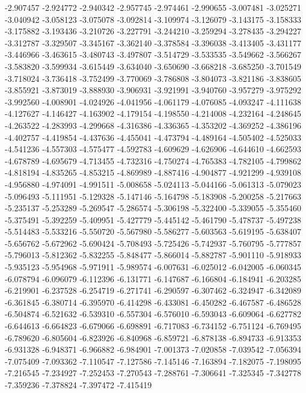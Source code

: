 -2.907457
-2.924772
-2.940342
-2.957745
-2.974461
-2.990655
-3.007481
-3.025271
-3.040942
-3.058123
-3.075078
-3.092814
-3.109974
-3.126079
-3.143175
-3.158333
-3.175882
-3.193436
-3.210726
-3.227791
-3.244210
-3.259294
-3.278435
-3.294227
-3.312787
-3.329507
-3.345167
-3.362140
-3.378584
-3.396038
-3.413405
-3.431177
-3.446966
-3.463615
-3.480743
-3.497807
-3.514729
-3.533535
-3.549662
-3.566267
-3.583820
-3.599934
-3.615449
-3.634040
-3.650690
-3.668218
-3.685250
-3.701549
-3.718024
-3.736418
-3.752499
-3.770069
-3.786808
-3.804073
-3.821186
-3.838605
-3.855921
-3.873019
-3.888930
-3.906931
-3.921991
-3.940760
-3.957279
-3.975292
-3.992560
-4.008901
-4.024926
-4.041956
-4.061179
-4.076085
-4.093247
-4.111638
-4.127627
-4.146427
-4.163902
-4.179154
-4.198550
-4.214008
-4.232164
-4.248645
-4.263522
-4.283993
-4.299668
-4.316386
-4.336365
-4.353202
-4.369252
-4.386196
-4.402757
-4.419854
-4.437636
-4.455041
-4.473794
-4.489164
-4.505402
-4.525033
-4.541236
-4.557303
-4.575477
-4.592783
-4.609629
-4.626906
-4.644610
-4.662593
-4.678789
-4.695679
-4.713455
-4.732316
-4.750274
-4.765383
-4.782105
-4.799862
-4.818194
-4.835265
-4.853215
-4.869989
-4.887416
-4.904877
-4.921299
-4.939108
-4.956880
-4.974091
-4.991511
-5.008658
-5.024113
-5.044166
-5.061313
-5.079023
-5.096493
-5.111951
-5.129328
-5.147146
-5.164798
-5.183908
-5.200258
-5.217663
-5.235137
-5.253289
-5.269547
-5.286574
-5.306198
-5.322400
-5.339055
-5.355460
-5.375491
-5.392259
-5.409951
-5.427779
-5.445142
-5.461790
-5.478737
-5.497238
-5.514483
-5.533216
-5.550720
-5.567980
-5.586277
-5.603563
-5.619195
-5.638407
-5.656762
-5.672962
-5.690424
-5.708493
-5.725426
-5.742937
-5.760795
-5.777857
-5.796013
-5.812362
-5.832255
-5.848477
-5.866014
-5.882787
-5.901110
-5.918933
-5.935123
-5.954968
-5.971911
-5.989574
-6.007631
-6.025012
-6.042005
-6.060345
-6.078794
-6.096079
-6.112396
-6.131771
-6.147687
-6.166804
-6.184941
-6.203285
-6.219901
-6.237528
-6.254719
-6.271741
-6.290597
-6.307462
-6.324947
-6.342089
-6.361845
-6.380714
-6.395970
-6.414298
-6.433081
-6.450282
-6.467587
-6.486528
-6.504874
-6.521632
-6.539310
-6.557304
-6.576010
-6.593043
-6.609064
-6.627782
-6.644613
-6.664823
-6.679066
-6.698891
-6.717083
-6.734152
-6.751124
-6.769495
-6.789620
-6.805604
-6.823926
-6.840968
-6.859721
-6.878138
-6.894733
-6.913353
-6.931328
-6.948371
-6.966882
-6.984901
-7.001373
-7.020858
-7.039542
-7.056394
-7.075409
-7.093362
-7.110547
-7.127586
-7.145146
-7.163894
-7.182075
-7.198095
-7.216545
-7.234927
-7.252453
-7.270543
-7.288761
-7.306641
-7.325345
-7.342778
-7.359236
-7.378824
-7.397472
-7.415419
